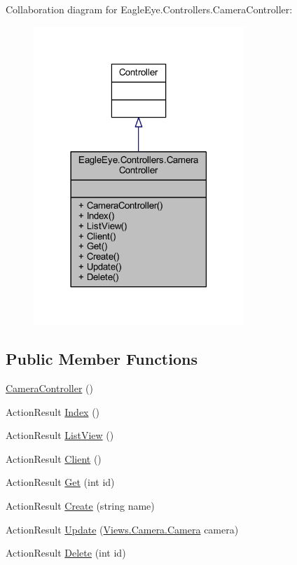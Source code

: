 Collaboration diagram for Eagle\+Eye.\+Controllers.\+Camera\+Controller\+:
\nopagebreak
\begin{figure}[H]
\begin{center}
\leavevmode
\includegraphics[width=225pt]{class_eagle_eye_1_1_controllers_1_1_camera_controller__coll__graph}
\end{center}
\end{figure}
\subsection*{Public Member Functions}
\begin{DoxyCompactItemize}
\item 
\mbox{\hyperlink{class_eagle_eye_1_1_controllers_1_1_camera_controller_a6b73ce65988171c22a039de9de4ac2c0}{Camera\+Controller}} ()
\item 
Action\+Result \mbox{\hyperlink{class_eagle_eye_1_1_controllers_1_1_camera_controller_aef90502fd5923368a7ef1773280e4b32}{Index}} ()
\item 
Action\+Result \mbox{\hyperlink{class_eagle_eye_1_1_controllers_1_1_camera_controller_ae60e0235e0f741b4e102a7d1df22eed1}{List\+View}} ()
\item 
Action\+Result \mbox{\hyperlink{class_eagle_eye_1_1_controllers_1_1_camera_controller_a22c71acb769ab89d66c816e8af2dd55e}{Client}} ()
\item 
Action\+Result \mbox{\hyperlink{class_eagle_eye_1_1_controllers_1_1_camera_controller_a6dfc692f61939468dffcf13b5899ed5f}{Get}} (int id)
\item 
Action\+Result \mbox{\hyperlink{class_eagle_eye_1_1_controllers_1_1_camera_controller_a07c68e0e159c17b1725489ddf54f9f1d}{Create}} (string name)
\item 
Action\+Result \mbox{\hyperlink{class_eagle_eye_1_1_controllers_1_1_camera_controller_a9e43f7e6f051aa5dbc695d68b4b013ab}{Update}} (\mbox{\hyperlink{class_eagle_eye_1_1_views_1_1_camera_1_1_camera}{Views.\+Camera.\+Camera}} camera)
\item 
Action\+Result \mbox{\hyperlink{class_eagle_eye_1_1_controllers_1_1_camera_controller_ade4d5c697769c79b1866f95bbf7fc889}{Delete}} (int id)
\end{DoxyCompactItemize}



